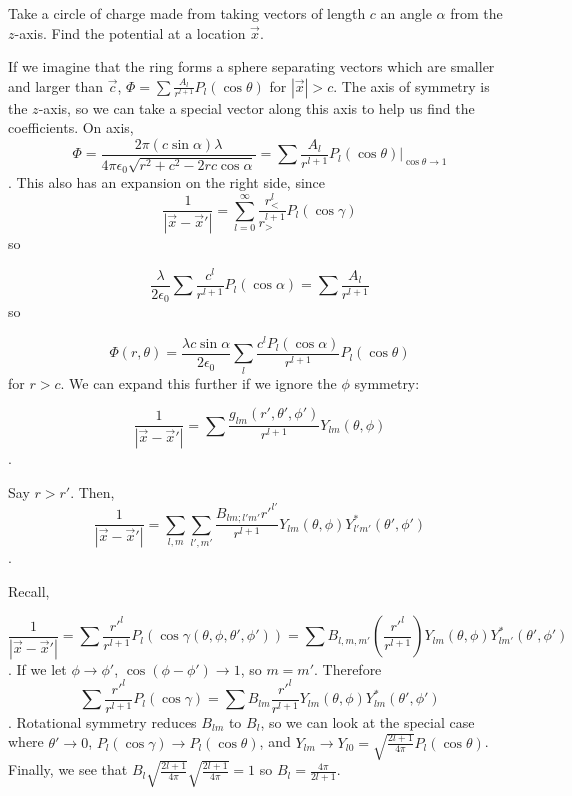 \documentclass[a4paper,twoside,master.tex]{subfiles}
\begin{document}
\begin{ex}
    Take a circle of charge made from taking vectors of length $c$ an angle $\alpha$ from the $z$-axis. Find the potential at a location $\vec{x}$.

If we imagine that the ring forms a sphere separating vectors which are smaller and larger than $\vec{c}$, $\Phi = \sum\frac{A_l}{r^{l+1}}P_l(\cos\theta)$ for $|\vec{x}|>c$. The axis of symmetry is the $z$-axis, so we can take a special vector along this axis to help us find the coefficients. On axis,
\begin{equation}
    \Phi = \frac{2\pi(c\sin\alpha)\lambda}{4\pi\epsilon_0\sqrt{r^2+c^2-2rc\cos\alpha}} = \sum\frac{A_l}{r^{l+1}}P_l(\cos\theta)\bigg|_{\cos\theta\to1}
\end{equation}.
This also has an expansion on the right side, since
\begin{equation}
    \frac{1}{|\vec{x}-\vec{x}'|} = \sum_{l=0}^\infty \frac{r_<^l}{r_>^{l+1}}P_l(\cos\gamma)
\end{equation}
so

\begin{equation}
    \frac{\lambda}{2\epsilon_0}\sum \frac{c^l}{r^{l+1}}P_l(\cos\alpha) = \sum\frac{A_l}{r^{l+1}}
\end{equation}
so

\begin{equation}
    \Phi(r,\theta) = \frac{\lambda c\sin\alpha}{2\epsilon_0}\sum_l\frac{c^l P_l(\cos\alpha)}{r^{l+1}}P_l(\cos\theta)
\end{equation}
for $r>c$. We can expand this further if we ignore the $\phi$
symmetry:

\begin{equation}
    \frac{1}{|\vec{x}-\vec{x}'|} = \sum \frac{g_{lm}(r',\theta',\phi')}{r^{l+1}}Y_{lm}(\theta,\phi)
\end{equation}.

Say $r>r'$. Then,
\begin{equation}
    \frac{1}{|\vec{x}-\vec{x}'|} = \sum_{l,m}\sum_{l',m'} \frac{B_{lm;l'm'}r'^{l'}}{r^{l+1}}Y_{lm}(\theta,\phi)Y_{l'm'}^*(\theta',\phi')
\end{equation}.

Recall,

\begin{equation}
    \frac{1}{|\vec{x}-\vec{x}'|} = \sum\frac{r'^l}{r^{l+1}}P_l(\cos\gamma(\theta,\phi,\theta',\phi')) = \sum B_{l,m,m'}\left(\frac{r'^l}{r^{l+1}}\right)Y_{lm}(\theta,\phi)Y_{lm'}^*(\theta',\phi')
\end{equation}.
If we let $\phi\to\phi'$, $\cos(\phi-\phi')\to 1$, so $m = m'$. Therefore
\begin{equation}
    \sum\frac{r'^l}{r^{l+1}}P_l(\cos\gamma) = \sum B_{lm}\frac{r'^l}{r^{l+1}}Y_{lm}(\theta,\phi)Y_{lm}^*(\theta',\phi')
\end{equation}.
Rotational symmetry reduces $B_{lm}$ to $B_l$, so we can look at the special case where $\theta'\to 0$, $P_l(\cos\gamma)\to P_l(\cos\theta)$, and $Y_{lm}\to Y_{l0} = \sqrt{\frac{2l+1}{4\pi}}P_l(\cos\theta)$. Finally, we see that $B_l\sqrt{\frac{2l+1}{4\pi}}\sqrt{\frac{2l+1}{4\pi}} = 1$ so $B_l = \frac{4\pi}{2l+1}$.


\end{ex}
\end{document}
